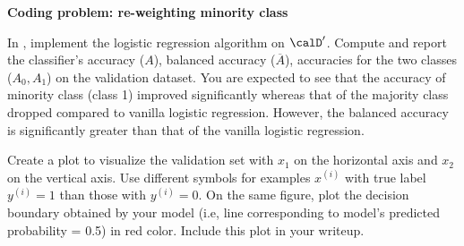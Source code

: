 \item {} \textbf{Coding problem: re-weighting minority class}

In , implement the logistic regression algorithm on $\calD'$.  Compute and report the classifier's accuracy ($A$), balanced accuracy ($\overline{A}$), accuracies for the two classes ($A_0, A_1$) on the validation dataset. You are expected to see that the accuracy of minority class (class 1) improved significantly whereas that of the majority class dropped compared to vanilla logistic regression. However, the balanced accuracy is significantly greater than that of the vanilla logistic regression.


Create a plot to visualize the validation set with $x_1$ on the horizontal axis and $x_2$ on
the vertical axis. Use different symbols for examples $x^{(i)}$ with true label $y^{(i)} = 1$
than those with $y^{(i)} = 0$. On the same figure, plot the decision boundary obtained
by your model (i.e, line corresponding to model's predicted probability = 0.5) in red color. Include
this plot in your writeup.


